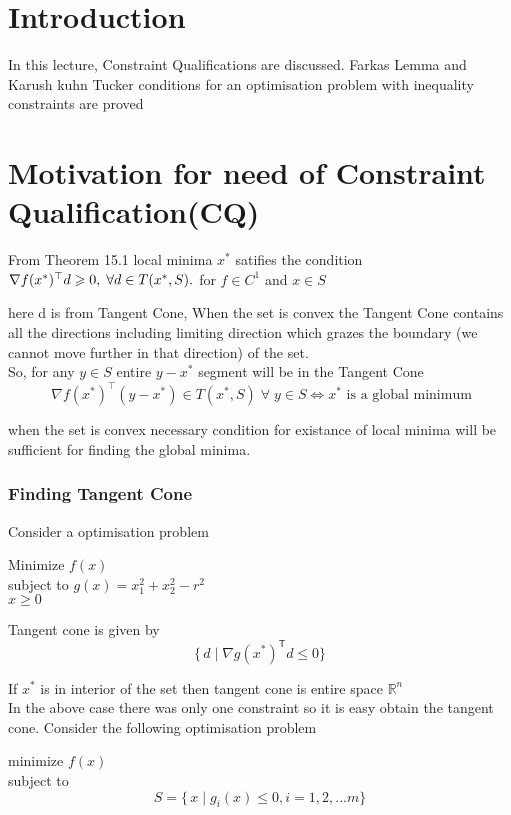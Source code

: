 \documentclass[twoside]{article}
\begin{document}
\section{Introduction}
In this lecture, Constraint Qualifications are discussed. Farkas Lemma and Karush kuhn Tucker conditions for an optimisation problem with inequality constraints are proved  

\section{Motivation for need of Constraint Qualification(CQ)}
From Theorem 15.1 local minima $x^*$ satifies the condition $\nabla f(x^{*})^{\top}d \geqslant 0, \hspace{1mm}\forall d \in T(x^{*},S).$ for $f \in C^{1}$ and $x \in S$

here d is from Tangent Cone, When the set is convex the Tangent Cone contains all the directions including limiting direction which grazes the boundary (we cannot move further in that direction) of the set.\\
So, for any $y \in S$ entire $ y-x^*$ segment will be in the Tangent Cone \\

$$\:\nabla f(x^{*})^\top(y-x^{*}) \in T(x^{*},S)  \; \forall \;y\in S \iff x^* \text{ is a global minimum}$$

when the set is convex necessary condition for existance of local minima will be sufficient for finding the global minima.\\

\subsubsection{Finding Tangent Cone}

Consider a optimisation problem 
\begin{center}
    Minimize $f(x)$\\
    subject to $ g(x) = x^{2}_{1}+x^{2}_2-r^{2}$\\$x\geq0$ 
\end{center}

Tangent cone is given by 
$$ \{\,d\mid \nabla g(x^*)^\mathsf{T}d\leq 0 \}$$

If $x^{*}$ is in interior of the set then tangent cone is entire space $\mathbb{R}^n$\\

In the above case there was only one constraint so it is easy obtain the tangent cone. Consider the following optimisation problem 
\begin{center}
	minimize $f(x)$\\
	subject to $$S = \{\,x\mid g_{i}(x)\leq 0 , i = 1,2,...m\}$$
\end{center}
\end{document}

